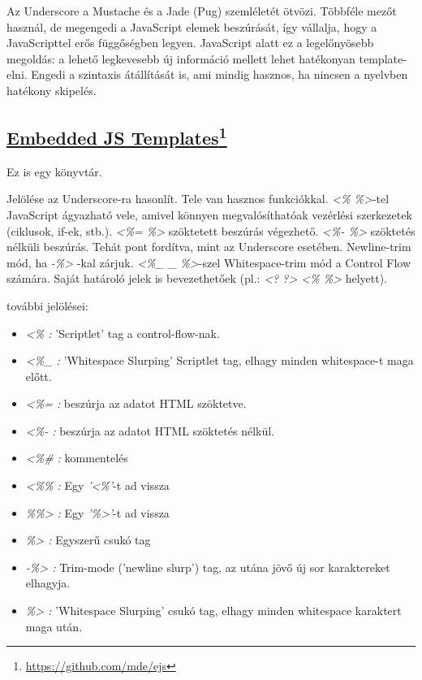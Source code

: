 Az Underscore a Mustache és a Jade (Pug) szemléletét ötvözi.
Többféle mezőt használ, de megengedi a JavaScript elemek beszúrását, így vállalja, hogy a JavaScripttel erős függőségben legyen.
JavaScript alatt ez a legelőnyösebb megoldás: a lehető legkevesebb új információ mellett lehet hatékonyan template-elni.
Engedi a szintaxis átállítását is, ami mindig hasznos, ha nincsen a nyelvben hatékony skipelés.

\subsection[Embedded JS Templates]{\href{https://github.com/mde/ejs}{Embedded JS Templates}\footnote{\url{https://github.com/mde/ejs}}}
\label{sec:embedded}
Ez is egy könyvtár.

Jelölése az Underscore-ra hasonlít. Tele van hasznos funkciókkal.
\textit{<\% \%>}-tel JavaScript ágyazható vele, amivel könnyen megvalósíthatóak vezérlési szerkezetek (ciklusok, if-ek, stb.).
\textit{<\%= \%>} szöktetett beszúrás végezhető. 
\textit{<\%-  \%>} szöktetés nélküli beszúrás.
Tehát pont fordítva, mint az Underscore esetében.
Newline-trim mód, ha \textit{-\%>} -kal zárjuk.
\textit{<\%\_  \_ \%>}-szel Whitespace-trim mód a Control Flow számára. 
Saját határoló jelek is bevezethetőek (pl.: \textit{<? ?> <\% \%>} helyett).

további jelölései:
\begin{itemize}
\item \emph{\textit{<\%} :} 'Scriptlet' tag a control-flow-nak.
\item \emph{\textit{<\%\_} :} 'Whitespace Slurping' Scriptlet tag, elhagy minden whitespace-t maga előtt.
\item \emph{\textit{<\%=} :} beszúrja az adatot HTML szöktetve.
\item \emph{\textit{<\%-} :} beszúrja az adatot HTML szöktetés nélkül.
\item \emph{\textit{<\%\#} :} kommentelés
\item \emph{\textit{<\%\%} :} Egy \textit{'<\%'}-t ad vissza
\item \emph{\textit{\%\%>} :} Egy \textit{'\%>'}-t ad vissza
\item \emph{\textit{\%>} :} Egyszerű csukó tag
\item \emph{\textit{-\%>} :} Trim-mode ('newline slurp') tag, az utána jövő új sor karaktereket elhagyja.
\item \emph{\textit{\%>} :} 'Whitespace Slurping' csukó tag, elhagy minden whitespace karaktert maga után.
\end{itemize}

